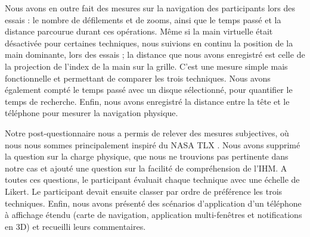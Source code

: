 Nous avons en outre fait des mesures sur la navigation des participants lors des essais : le nombre de défilements et de zooms, ainsi que le temps passé et la distance parcourue durant ces opérations. Même si la main virtuelle était désactivée pour certaines techniques, nous suivions en continu la position de la main dominante, lors des essais ; la distance que nous avons enregistré est celle de la projection de l'index de la main sur la grille. C'est une mesure simple mais fonctionnelle et permettant de comparer les trois techniques. Nous avons également compté le temps passé avec un disque sélectionné, pour quantifier le temps de recherche. Enfin, nous avons enregistré la distance entre la tête et le téléphone pour mesurer la navigation physique.

Notre post-questionnaire nous a permis de relever des mesures subjectives, où nous nous sommes principalement inspiré du NASA TLX \cite{Rubio2004}. Nous avons supprimé la question sur la charge physique, que nous ne trouvions pas pertinente dans notre cas et ajouté une question sur la facilité de compréhension de l'IHM. A toutes ces questions, le participant évaluait chaque technique avec une échelle de Likert. Le participant devait ensuite classer par ordre de préférence les trois techniques. Enfin, nous avons présenté des scénarios d'application d'un téléphone à affichage étendu (carte de navigation, application multi-fenêtres et notifications en 3D) et recueilli leurs commentaires.

